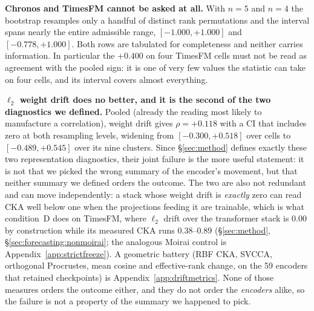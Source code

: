 \begin{table}[!htbp]
\centering\footnotesize
\caption{\textbf{The within-backbone dissociation, one capacity, eight cells.}
Every Moirai-Base cell, ordered by CKA (most drifted first). ``Full FT'' and
``Frozen'' are percent change in held-out MSE against zero-shot, so negative is
better and positive is task-level forgetting; $\denc$ is the manipulated contrast
between them. Gate values marked~\textsuperscript{f} fail the $0.20$ screen.
Reading down the CKA column, the outcome reverses sign: the two least drifted
cells are the only two that degrade. Emitted by
\texttt{scripts/emit\_dissociation.py}, which asserts both of those claims
against the run records and exits non-zero if they stop holding.}
\label{tab:dissociation}

\end{table}

\textbf{Chronos and TimesFM cannot be asked at all.} With $n{=}5$ and $n{=}4$
the bootstrap resamples only a handful of distinct rank permutations and the
interval spans nearly the entire admissible range, $[-1.000, +1.000]$ and
$[-0.778, +1.000]$. Both rows are tabulated for completeness and neither
carries information. In particular the $+0.400$ on four TimesFM cells must not
be read as agreement with the pooled sign: it is one of very few values the
statistic can take on four cells, and its interval covers almost everything.

\textbf{$\ell_2$ weight drift does no better, and it is the second of the two
diagnostics we defined.} Pooled (already the reading most likely to manufacture
a correlation), weight drift gives $\rho{=}{+}0.118$ with a CI that includes
zero at both resampling levels, widening from $[-0.300, +0.518]$ over cells to
$[-0.489, +0.545]$ over its nine clusters. Since \S\ref{sec:method} defines
exactly these two representation
diagnostics, their joint failure is the more useful statement: it is not that we
picked the wrong summary of the encoder's movement, but that neither summary we
defined orders the outcome. The two are also not redundant and can move
independently: a stack whose weight drift is \emph{exactly} zero can read CKA
well below one when the projections feeding it are trainable, which is what
condition~D does on TimesFM, where $\ell_2$ drift over the transformer stack is
$0.00$ by construction while its measured CKA runs $0.38$--$0.89$
(\S\ref{sec:method}, \S\ref{sec:forecasting:nonmoirai}; the analogous Moirai
control is Appendix~\ref{app:strictfreeze}). A geometric battery (RBF CKA,
SVCCA, orthogonal Procrustes, mean cosine and effective-rank change, on the 59
encoders that retained checkpoints) is Appendix~\ref{app:driftmetrics}. None of
those measures orders the outcome either, and they do not order the
\emph{encoders} alike, so the failure is not a property of the summary we
happened to pick.

